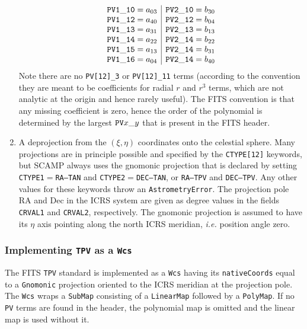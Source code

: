\documentclass[11pt,preprint,flushrt]{aastex}
\begin{document}
\begin{enumerate}
\begin{equation}
\begin{array}{c|c}
{\tt PV1\_10} = a_{03} & {\tt PV2\_10} = b_{30} \\
{\tt PV1\_12} = a_{40} & {\tt PV2\_12} = b_{04} \\
{\tt PV1\_13} = a_{31} & {\tt PV2\_13} = b_{13} \\
{\tt PV1\_14} = a_{22} & {\tt PV2\_14} = b_{22} \\
{\tt PV1\_15} = a_{13} & {\tt PV2\_14} = b_{31} \\
{\tt PV1\_16} = a_{04} & {\tt PV2\_14} = b_{40}
\end{array}
\end{equation}
Note there are no {\tt PV[12]\_3} or {\tt PV[12]\_11} terms (according to the convention they are meant to be coefficients for radial $r$ and $r^3$ terms, which are not analytic at the origin and hence rarely useful).  The FITS convention is that any missing coefficient is zero, hence the order of the polynomial is determined by the largest ${\tt PV}x\_y$ that is present in the FITS header.
\item A deprojection from the $(\xi,\eta)$ coordinates onto the celestial sphere.  Many projections are in principle possible and specified by the {\tt CTYPE[12]} keywords, but SCAMP always uses the gnomonic projection that is declared by setting {\tt CTYPE1}$=${\tt RA---TAN} and {\tt CTYPE2}$=${\tt DEC--TAN}, or {\tt RA---TPV} and {\tt DEC--TPV}.  Any other values for these keywords throw an {\tt AstrometryError}.  The projection pole RA and Dec in the ICRS system are given as degree values in the fields {\tt CRVAL1} and {\tt CRVAL2}, respectively.  The gnomonic projection is assumed to have its $\eta$ axis pointing along the north ICRS meridian, {\it i.e.} position angle zero.
\end{enumerate}

\subsubsection{Implementing {\tt TPV} as a {\tt Wcs}}
The FITS {\tt TPV} standard is implemented as a {\tt Wcs} having its {\tt nativeCoords} equal to a {\tt Gnomonic} projection oriented to the ICRS meridian at the projection pole.  The {\tt Wcs} wraps a {\tt SubMap} consisting of a {\tt LinearMap} followed by a {\tt PolyMap}.  
If no {\tt PV} terms are found in the header, the polynomial map is omitted and the linear map is used without it.
\end{document}
